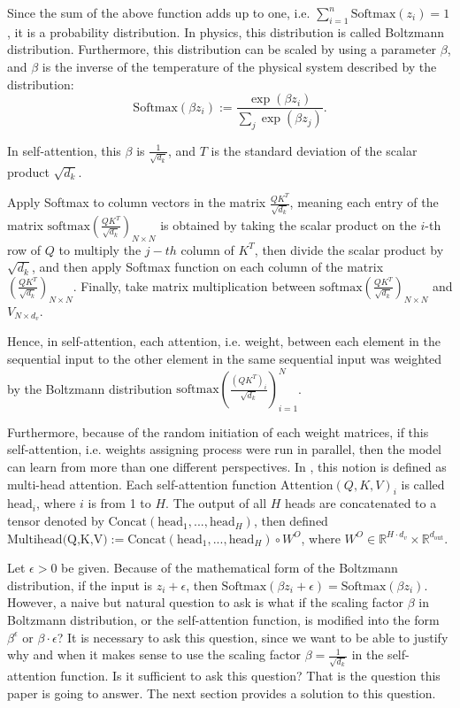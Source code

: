 \documentclass{article}
\theoremstyle{plain}
\theoremstyle{plain} %
\theoremstyle{definition}  %
\theoremstyle{remark}  %
\theoremstyle{plain}
\begin{document}
Since the sum of the above function adds up to one, i.e. $\sum\limits_{i=1}^n \text{Softmax}(z_i) =1$, it is a probability distribution. In physics, this distribution is called Boltzmann distribution. Furthermore, this distribution can be scaled by using a parameter $\beta$, and $\beta$ is the inverse of the temperature of the physical system described by the distribution:
$$
\text{Softmax}(\beta z_i) := \frac{\exp\left(\beta z_i \right) }{\sum\limits_j \exp\left(\beta z_j \right)}.
$$

In self-attention, this $\beta$ is $\frac{1}{\sqrt{d_k}}$, and $T$ is the standard deviation of the scalar product $\sqrt{d_k}$.

Apply Softmax to column vectors in the matrix $\frac{QK^T}{\sqrt{d_k}}$, meaning each entry of the matrix $\text{softmax}\left(\frac{QK^T}{\sqrt{d_k}} \right)_{N\times N}$ is obtained by taking the scalar product on the $i$-th row of $Q$ to multiply the $j-th$ column of $K^T$, then divide the scalar product by $\sqrt{d_k}$, and then apply Softmax function on each column of the matrix $\left(\frac{QK^T}{\sqrt{d_k}}\right)_{N\times N}$. Finally, take matrix multiplication between $\text{softmax}\left(\frac{QK^T}{\sqrt{d_k}} \right)_{N\times N}$ and $V_{N \times d_v}$. 

Hence, in self-attention, each attention, i.e. weight, between each element in the sequential input to the other element in the same sequential input was weighted by the Boltzmann distribution $\text{softmax}\left(\frac{\left( QK^T \right)_i}{\sqrt{d_k}} \right)_{i=1}^N$.

Furthermore, because of the random initiation of each weight matrices, if this self-attention, i.e. weights assigning process were run in parallel, then the model can learn from more than one different perspectives. In \cite{vaswani2017attention}, this notion is defined as multi-head attention. Each self-attention function  $\text{Attention}\left(Q,K,V\right)_i$ is called $\text{head}_i$, where $i$ is from 1 to $H$. The output of all $H$ heads are concatenated to a tensor denoted by $\text{Concat}\left(\text{head}_1,...,\text{head}_H \right)$, then defined $\text{Multihead(Q,K,V)}:= \text{Concat}\left(\text{head}_1,...,\text{head}_H \right)\circ W^O$, where $W^O\in \mathbb{R}^{H\cdot d_v}\times \mathbb{R}^{d_{\text{out}}}$.


Let $\epsilon>0$ be given. Because of the mathematical form of the Boltzmann distribution, if the input is $z_i+\epsilon$, then $\text{Softmax}(\beta z_i+\epsilon)=\text{Softmax}(\beta z_i).$ However, a naive but natural question to ask is what if the scaling factor $\beta$ in Boltzmann distribution, or the self-attention function, is modified into the form $\beta^\epsilon$ or $\beta\cdot\epsilon$? It is necessary to ask this question, since we want to be able to justify why and when it makes sense to use the scaling factor $\beta=\frac{1}{\sqrt{d_k}}$ in the self-attention function. Is it sufficient to ask this question? That is the question this paper is going to answer. The next section provides a solution to this question.
\end{document}
